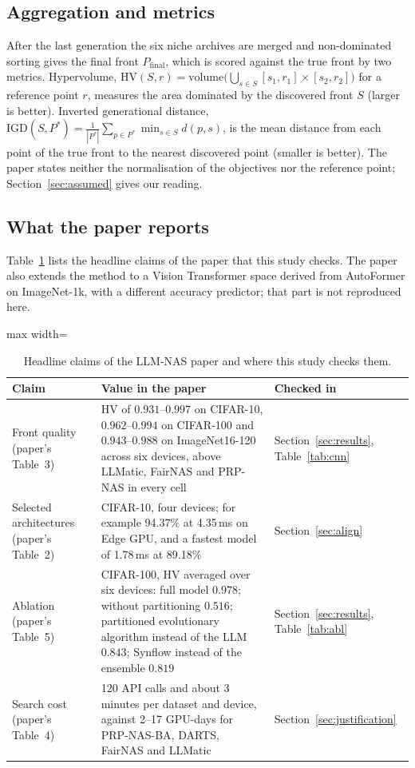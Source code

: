\documentclass[preprint,12pt,authoryear]{elsarticle}
\newcommand{\HV}{\mathrm{HV}}
\newcommand{\IGD}{\mathrm{IGD}}
\begin{document}
\subsection{Aggregation and metrics}
After the last generation the six niche archives are merged and non-dominated sorting gives the final front $P_{\mathrm{final}}$, which is scored against the true front by two metrics. Hypervolume, $\HV(S,r)=\mathrm{volume}\big(\bigcup_{s\in S}[s_1,r_1]\times[s_2,r_2]\big)$ for a reference point $r$, measures the area dominated by the discovered front $S$ (larger is better). Inverted generational distance, $\IGD(S,P^\ast)=\frac{1}{|P^\ast|}\sum_{p\in P^\ast}\min_{s\in S}d(p,s)$, is the mean distance from each point of the true front to the nearest discovered point (smaller is better). The paper states neither the normalisation of the objectives nor the reference point; Section~\ref{sec:assumed} gives our reading.

\subsection{What the paper reports}
Table~\ref{tab:claims} lists the headline claims of the paper that this study checks. The paper also extends the method to a Vision Transformer space derived from AutoFormer on ImageNet-1k, with a different accuracy predictor; that part is not reproduced here.

\begin{table}[h]\centering\small
\caption{Headline claims of the LLM-NAS paper and where this study checks them.}\label{tab:claims}
\begin{adjustbox}{max width=\linewidth}
\begin{tabular}{p{3.4cm}p{8.2cm}p{3.0cm}}
\toprule
Claim & Value in the paper & Checked in \\
\midrule
Front quality (paper's Table~3) & HV of $0.931$--$0.997$ on CIFAR-10, $0.962$--$0.994$ on CIFAR-100 and $0.943$--$0.988$ on ImageNet16-120 across six devices, above LLMatic, FairNAS and PRP-NAS in every cell & Section~\ref{sec:results}, Table~\ref{tab:cnn} \\
Selected architectures (paper's Table~2) & CIFAR-10, four devices; for example 94.37\% at 4.35\,ms on Edge GPU, and a fastest model of 1.78\,ms at 89.18\% & Section~\ref{sec:align} \\
Ablation (paper's Table~5) & CIFAR-100, HV averaged over six devices: full model $0.978$; without partitioning $0.516$; partitioned evolutionary algorithm instead of the LLM $0.843$; Synflow instead of the ensemble $0.819$ & Section~\ref{sec:results}, Table~\ref{tab:abl} \\
Search cost (paper's Table~4) & 120 API calls and about 3 minutes per dataset and device, against 2--17 GPU-days for PRP-NAS-BA, DARTS, FairNAS and LLMatic & Section~\ref{sec:justification} \\
\bottomrule
\end{tabular}
\end{adjustbox}
\end{table}
\end{document}
